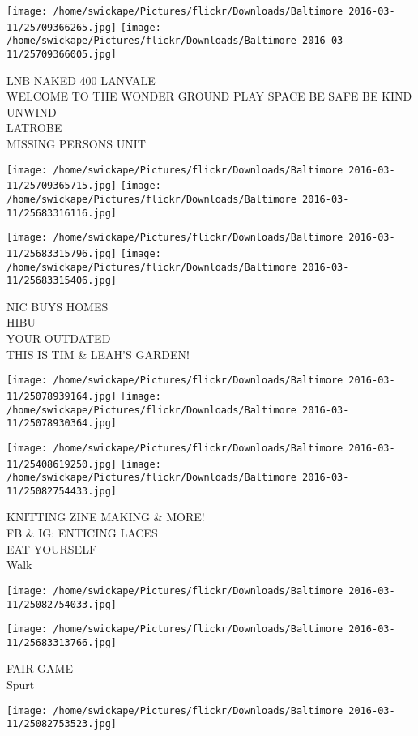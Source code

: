\documentclass[10pt,letterpaper]{article}
\begin{document}
\texttt{[image: /home/swickape/Pictures/flickr/Downloads/Baltimore 2016-03-11/25709366265.jpg]}
\texttt{[image: /home/swickape/Pictures/flickr/Downloads/Baltimore 2016-03-11/25709366005.jpg]}

LNB NAKED 400 LANVALE\\
WELCOME TO THE WONDER GROUND PLAY SPACE BE SAFE BE KIND UNWIND\\
LATROBE\\
MISSING PERSONS UNIT
\pagebreak

\texttt{[image: /home/swickape/Pictures/flickr/Downloads/Baltimore 2016-03-11/25709365715.jpg]}
\texttt{[image: /home/swickape/Pictures/flickr/Downloads/Baltimore 2016-03-11/25683316116.jpg]}

\texttt{[image: /home/swickape/Pictures/flickr/Downloads/Baltimore 2016-03-11/25683315796.jpg]}
\texttt{[image: /home/swickape/Pictures/flickr/Downloads/Baltimore 2016-03-11/25683315406.jpg]}

NIC BUYS HOMES\\
HIBU\\
YOUR OUTDATED\\
THIS IS TIM \& LEAH'S GARDEN!
\pagebreak

\texttt{[image: /home/swickape/Pictures/flickr/Downloads/Baltimore 2016-03-11/25078939164.jpg]}
\texttt{[image: /home/swickape/Pictures/flickr/Downloads/Baltimore 2016-03-11/25078930364.jpg]}

\texttt{[image: /home/swickape/Pictures/flickr/Downloads/Baltimore 2016-03-11/25408619250.jpg]}
\texttt{[image: /home/swickape/Pictures/flickr/Downloads/Baltimore 2016-03-11/25082754433.jpg]}

KNITTING ZINE MAKING \& MORE!\\
FB \& IG: ENTICING LACES\\
EAT YOURSELF\\
Walk
\pagebreak

\texttt{[image: /home/swickape/Pictures/flickr/Downloads/Baltimore 2016-03-11/25082754033.jpg]}

\vspace{0.25in}
\texttt{[image: /home/swickape/Pictures/flickr/Downloads/Baltimore 2016-03-11/25683313766.jpg]}

FAIR GAME\\
Spurt
\pagebreak

\texttt{[image: /home/swickape/Pictures/flickr/Downloads/Baltimore 2016-03-11/25082753523.jpg]}
\end{document}
